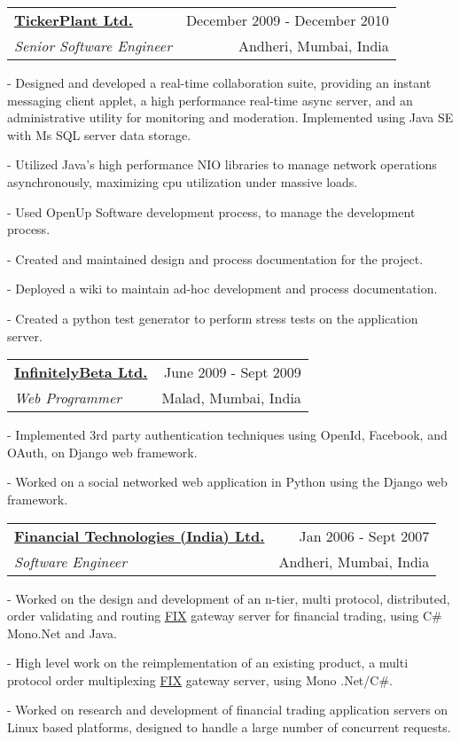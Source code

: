 \documentclass[10pt]{article}
\makeatletter
\newcommand{\employer}[4]{ 
        \vspace*{6pt}
	\begin{tabular*}{\textwidth}{l@{\extracolsep{\fill}}r}
	\textbf{#1} & #2 \\
                #3  & #4 \\ 
	\end{tabular*}
}
\newenvironment{achievements}{
        \vspace{-0pt}
        \begin{list}
        {}
        {\topsep 0pt \itemsep -3pt}
}
{
        \end{list}
}
\makeatother
\begin{document}
\employer{\href{http://www.Tickerplantindia.com/}{TickerPlant Ltd.}}{December 2009 - December 2010}{\emph{Senior Software Engineer}} {Andheri, Mumbai, India}
	\begin{achievements}
                \item[-] Designed and developed a real-time collaboration suite, providing an instant messaging client applet, a high performance real-time async server, and an administrative utility for monitoring and moderation. Implemented using Java SE with Ms SQL server data storage.
                \item[-] Utilized Java's high performance NIO libraries to manage network operations asynchronously, maximizing cpu utilization under massive loads.
                \item[-] Used OpenUp Software development process, to manage the development process.
                \item[-] Created and maintained design and process documentation for the project.
                \item[-] Deployed a wiki to maintain ad-hoc development and process documentation.
                \item[-] Created a python test generator to perform stress tests on the application server.
	\end{achievements}
\vspace{5pt}
\employer{\href{http://www.InfinitelyBeta.com/}{InfinitelyBeta Ltd.}}{June 2009 - Sept 2009}{\emph{Web Programmer}} {Malad, Mumbai, India}
	\begin{achievements}
                \item[-] Implemented 3rd party authentication techniques using OpenId, Facebook, and OAuth, on Django web framework.
                \item[-] Worked on a social networked web application in Python using the Django web framework.
	\end{achievements}
\vspace{5pt}
\employer{\href{http://www.ftindia.com/}{Financial Technologies (India) Ltd.}}{Jan 2006 - Sept 2007}{\emph{Software Engineer}} {Andheri, Mumbai, India}
	\begin{achievements}
                \item[-] Worked on the design and development of an n-tier, multi protocol, distributed, order validating and routing \href{http://en.wikipedia.org/wiki/FIX_protocol}{FIX} gateway server for financial trading, using C\# Mono.Net and Java.
                \item[-] High level work on the reimplementation of an existing product, a multi protocol order multiplexing \href{http://en.wikipedia.org/wiki/FIX_protocol}{FIX} gateway server, using Mono .Net/C\#.
                \item[-] Worked on research and development of financial trading application servers on Linux based platforms, designed to handle a large number of concurrent requests.
	\end{achievements}
\end{document}
